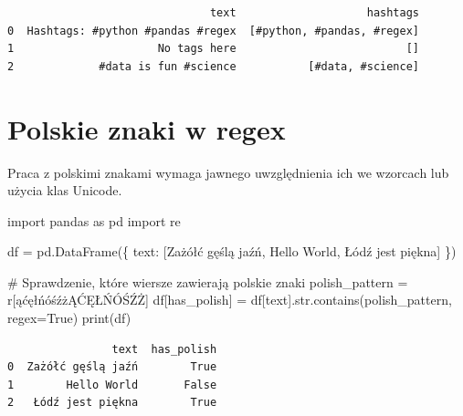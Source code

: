 \documentclass[
  polish,
  letterpaper,
  DIV=11,
  numbers=noendperiod]{scrreprt}
\newenvironment{Shaded}{\begin{snugshade}}{\end{snugshade}}
\newcommand{\BuiltInTok}[1]{\textcolor[rgb]{0.00,0.23,0.31}{#1}}
\newcommand{\CommentTok}[1]{\textcolor[rgb]{0.37,0.37,0.37}{#1}}
\newcommand{\ImportTok}[1]{\textcolor[rgb]{0.00,0.46,0.62}{#1}}
\newcommand{\NormalTok}[1]{\textcolor[rgb]{0.00,0.23,0.31}{#1}}
\newcommand{\OperatorTok}[1]{\textcolor[rgb]{0.37,0.37,0.37}{#1}}
\newcommand{\PreprocessorTok}[1]{\textcolor[rgb]{0.68,0.00,0.00}{#1}}
\newcommand{\StringTok}[1]{\textcolor[rgb]{0.13,0.47,0.30}{#1}}
\newcommand{\VariableTok}[1]{\textcolor[rgb]{0.07,0.07,0.07}{#1}}
\newcommand{\VerbatimStringTok}[1]{\textcolor[rgb]{0.13,0.47,0.30}{#1}}
\begin{document}
\begin{verbatim}
                               text                    hashtags
0  Hashtags: #python #pandas #regex  [#python, #pandas, #regex]
1                      No tags here                          []
2             #data is fun #science           [#data, #science]
\end{verbatim}

\section{Polskie znaki w regex}\label{polskie-znaki-w-regex}

Praca z polskimi znakami wymaga jawnego uwzględnienia ich we wzorcach
lub użycia klas Unicode.

\begin{Shaded}
\begin{Highlighting}[]
\ImportTok{import}\NormalTok{ pandas }\ImportTok{as}\NormalTok{ pd}
\ImportTok{import}\NormalTok{ re}

\NormalTok{df }\OperatorTok{=}\NormalTok{ pd.DataFrame(\{}
    \StringTok{\textquotesingle{}text\textquotesingle{}}\NormalTok{: [}\StringTok{\textquotesingle{}Zażółć gęślą jaźń\textquotesingle{}}\NormalTok{, }\StringTok{\textquotesingle{}Hello World\textquotesingle{}}\NormalTok{, }\StringTok{\textquotesingle{}Łódź jest piękna\textquotesingle{}}\NormalTok{]}
\NormalTok{\})}

\CommentTok{\# Sprawdzenie, które wiersze zawierają polskie znaki}
\NormalTok{polish\_pattern }\OperatorTok{=} \VerbatimStringTok{r\textquotesingle{}}\PreprocessorTok{[ąćęłńóśźżĄĆĘŁŃÓŚŹŻ]}\VerbatimStringTok{\textquotesingle{}}
\NormalTok{df[}\StringTok{\textquotesingle{}has\_polish\textquotesingle{}}\NormalTok{] }\OperatorTok{=}\NormalTok{ df[}\StringTok{\textquotesingle{}text\textquotesingle{}}\NormalTok{].}\BuiltInTok{str}\NormalTok{.contains(polish\_pattern, regex}\OperatorTok{=}\VariableTok{True}\NormalTok{)}
\BuiltInTok{print}\NormalTok{(df)}
\end{Highlighting}
\end{Shaded}

\begin{verbatim}
                text  has_polish
0  Zażółć gęślą jaźń        True
1        Hello World       False
2   Łódź jest piękna        True
\end{verbatim}
\end{document}
